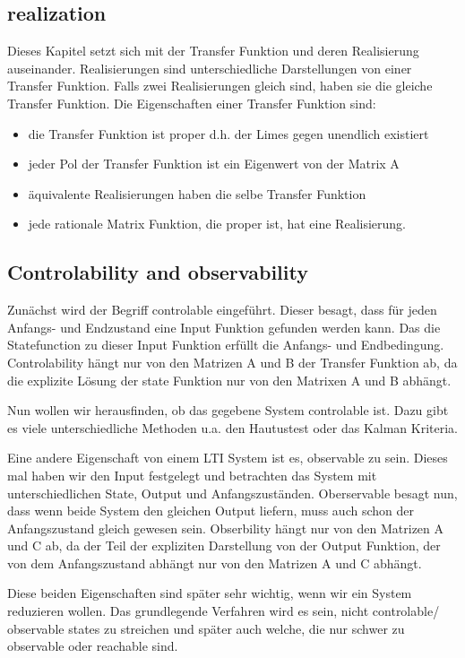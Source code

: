 \documentclass[]{article}
\begin{document}
\subsection{realization}
Dieses Kapitel setzt sich mit der Transfer Funktion und deren Realisierung auseinander. Realisierungen sind unterschiedliche Darstellungen von einer Transfer Funktion. Falls zwei Realisierungen gleich sind, haben sie die gleiche Transfer Funktion.  
 Die Eigenschaften einer Transfer Funktion sind: 
\begin{itemize}
	\item die Transfer Funktion ist proper d.h. der Limes gegen unendlich existiert
	\item jeder Pol der Transfer Funktion ist ein Eigenwert von der Matrix A
	\item äquivalente Realisierungen haben die selbe Transfer Funktion
	\item jede rationale Matrix Funktion, die proper ist, hat eine Realisierung. 
\end{itemize}

\subsection{Controlability and observability}
Zunächst wird der Begriff controlable eingeführt. Dieser besagt, dass für jeden Anfangs- und Endzustand eine Input Funktion gefunden werden kann. Das die Statefunction zu dieser Input Funktion erfüllt die Anfangs- und Endbedingung. Controlability hängt nur von den Matrizen A und B der Transfer Funktion ab, da die explizite Lösung der state Funktion nur von den Matrixen A und B abhängt. 

Nun wollen wir herausfinden, ob das gegebene System controlable ist. Dazu gibt es viele unterschiedliche Methoden u.a. den Hautustest oder das Kalman Kriteria. 

Eine andere Eigenschaft von einem LTI System ist es, observable zu sein. Dieses mal haben wir den Input festgelegt und betrachten das System mit unterschiedlichen State, Output und Anfangszuständen. Oberservable besagt nun, dass wenn beide System den gleichen Output liefern, muss auch schon der Anfangszustand gleich gewesen sein. Obserbility hängt nur von den Matrizen A und C ab, da der Teil der expliziten Darstellung von der Output Funktion, der von dem Anfangszustand abhängt nur von den Matrizen A und C abhängt. 

Diese beiden Eigenschaften sind später sehr wichtig, wenn wir ein System reduzieren wollen. Das grundlegende Verfahren wird es sein, nicht controlable/ observable states zu streichen und später auch welche, die nur schwer zu observable oder reachable sind. 
\end{document}
